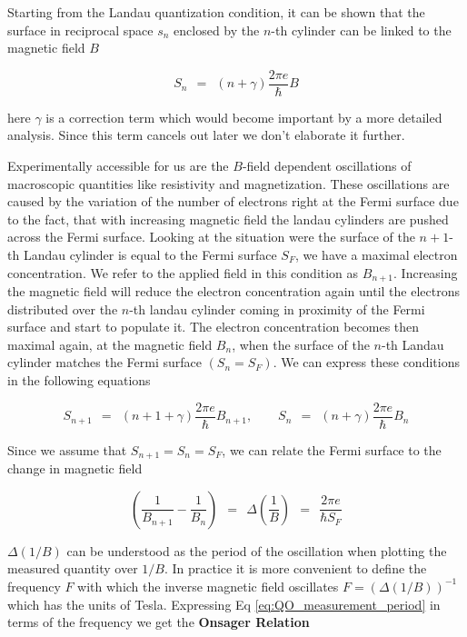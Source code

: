 \documentclass[10pt]{report}
\numberwithin{equation}{chapter}
\newcommand{\refEq}[1]{
  Eq  \ref{#1}
}
\begin{document}
Starting from the Landau quantization condition, it can be shown that the surface in reciprocal space $s_n$ enclosed by the $n$-th cylinder can be linked to the magnetic field $B$ 

\begin{equation}
  S_n   ~~=~~ (n + \gamma) \frac{2\pi e}{\hbar} B
\end{equation}


here $\gamma$ is a correction term which would become important by a more detailed analysis. Since this term cancels out later we don't elaborate it further.

Experimentally accessible for us are the $B$-field dependent oscillations of macroscopic quantities like resistivity and magnetization.
These oscillations are caused by the variation of the number of electrons right at the Fermi surface due to the fact, that with increasing magnetic field the landau cylinders are pushed across the Fermi surface.
Looking at the situation were the surface of the $n+1$-th Landau cylinder is equal to the Fermi surface $S_F$, we have a maximal electron concentration. 
We refer to the applied field in this condition as $B_{n+1}$. 
Increasing the magnetic field will reduce the electron concentration again until the electrons distributed over the $n$-th landau cylinder coming in proximity of the Fermi surface and start to populate it. 
The electron concentration becomes then  maximal again, at the magnetic field $B_n$, when the surface of the $n$-th Landau cylinder matches the Fermi surface $(S_n = S_F)$.
We can express these conditions in the following equations

\begin{equation}
  S_{n+1} ~~=~~ (n+1+\gamma) \frac{2\pi e}{\hbar} B_{n+1}, ~~~~~~~~~
  S_n ~~=~~ (n+\gamma) \frac{2\pi e}{\hbar} B_n
\end{equation}

Since we assume that $S_{n+1} = S_n = S_F$, we can relate the Fermi surface to the change in magnetic field

\begin{equation} \label{eq:QO_measurement_period}
  \left( \frac{1}{B_{n+1}} - \frac{1}{B_n} \right) ~~=~~ \Delta \left( \frac{1}{B} \right) 
  ~~=~~ \frac{2\pi e}{\hbar S_F}
\end{equation}

$\Delta (1/B)$ can be understood as the period of the oscillation when plotting the measured quantity over $1/B$. In practice it is more convenient to define the frequency $F$ with which the inverse magnetic field oscillates $F=(\Delta (1/B))^{-1}$ which has the units of Tesla. Expressing \refEq{eq:QO_measurement_period} in terms of the frequency we get the \textbf{Onsager Relation}
\end{document}
